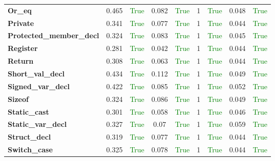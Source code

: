 \documentclass{article}
\begin{document}
\begin{xltabular}{\textwidth}{lcccccccc}
\textbf{{\fontsize{10}{12}\selectfont Or\_eq}}& 0.465&\textcolor{green}{True}& 0.082&\textcolor{green}{True}& 1&\textcolor{green}{True}& 0.048&\textcolor{green}{True} \\[0.5ex]
\textbf{{\fontsize{10}{12}\selectfont Private}}& 0.341&\textcolor{green}{True}& 0.077&\textcolor{green}{True}& 1&\textcolor{green}{True}& 0.044&\textcolor{green}{True} \\[0.5ex]
\textbf{{\fontsize{10}{12}\selectfont Protected\_member\_decl}}& 0.324&\textcolor{green}{True}& 0.083&\textcolor{green}{True}& 1&\textcolor{green}{True}& 0.045&\textcolor{green}{True} \\[0.5ex]
\textbf{{\fontsize{10}{12}\selectfont Register}}& 0.281&\textcolor{green}{True}& 0.042&\textcolor{green}{True}& 1&\textcolor{green}{True}& 0.044&\textcolor{green}{True} \\[0.5ex]
\textbf{{\fontsize{10}{12}\selectfont Return}}& 0.308&\textcolor{green}{True}& 0.063&\textcolor{green}{True}& 1&\textcolor{green}{True}& 0.044&\textcolor{green}{True} \\[0.5ex]
\textbf{{\fontsize{10}{12}\selectfont Short\_val\_decl}}& 0.434&\textcolor{green}{True}& 0.112&\textcolor{green}{True}& 1&\textcolor{green}{True}& 0.049&\textcolor{green}{True} \\[0.5ex]
\textbf{{\fontsize{10}{12}\selectfont Signed\_var\_decl}}& 0.422&\textcolor{green}{True}& 0.085&\textcolor{green}{True}& 1&\textcolor{green}{True}& 0.052&\textcolor{green}{True} \\[0.5ex]
\textbf{{\fontsize{10}{12}\selectfont Sizeof}}& 0.324&\textcolor{green}{True}& 0.086&\textcolor{green}{True}& 1&\textcolor{green}{True}& 0.049&\textcolor{green}{True} \\[0.5ex]
\textbf{{\fontsize{10}{12}\selectfont Static\_cast}}& 0.301&\textcolor{green}{True}& 0.058&\textcolor{green}{True}& 1&\textcolor{green}{True}& 0.046&\textcolor{green}{True} \\[0.5ex]
\textbf{{\fontsize{10}{12}\selectfont Static\_var\_decl}}& 0.327&\textcolor{green}{True}& 0.07&\textcolor{green}{True}& 1&\textcolor{green}{True}& 0.059&\textcolor{green}{True} \\[0.5ex]
\textbf{{\fontsize{10}{12}\selectfont Struct\_decl}}& 0.319&\textcolor{green}{True}& 0.077&\textcolor{green}{True}& 1&\textcolor{green}{True}& 0.044&\textcolor{green}{True} \\[0.5ex]
\textbf{{\fontsize{10}{12}\selectfont Switch\_case}}& 0.325&\textcolor{green}{True}& 0.078&\textcolor{green}{True}& 1&\textcolor{green}{True}& 0.044&\textcolor{green}{True} \\[0.5ex]

\end{xltabular}
\end{document}
